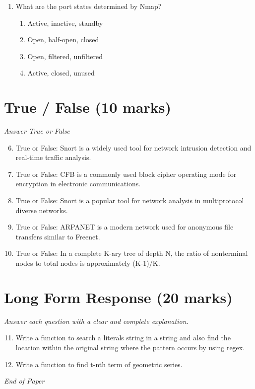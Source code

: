 \documentclass[12pt]{article}
\begin{document}
\begin{enumerate}[label=\arabic*.]
\begin{enumerate}[label=(\alph*)]
    \item Replaced
    \item Overview
    \item Changed
    \item Violated
\end{enumerate}
\item What are the port states determined by Nmap?
\begin{enumerate}[label=(\alph*)]
    \item Active, inactive, standby
    \item Open, half-open, closed
    \item Open, filtered, unfiltered
    \item Active, closed, unused
\end{enumerate}
\end{enumerate}

\section*{True / False (10 marks)}
\textit{Answer True or False}
\begin{enumerate}[label=\arabic*.]
\setcounter{enumi}{5}
\item True or False: Snort is a widely used tool for network intrusion detection and real-time traffic analysis.
\item True or False: CFB is a commonly used block cipher operating mode for encryption in electronic communications.
\item True or False: Snort is a popular tool for network analysis in multiprotocol diverse networks.
\item True or False: ARPANET is a modern network used for anonymous file transfers similar to Freenet.
\item True or False: In a complete K-ary tree of depth N, the ratio of nonterminal nodes to total nodes is approximately (K-1)/K.
\end{enumerate}

\section*{Long Form Response (20 marks)}
\textit{Answer each question with a clear and complete explanation.}
\begin{enumerate}[label=\arabic*.]
\setcounter{enumi}{10}
\item Write a function to search a literals string in a string and also find the location within the original string where the pattern occurs by using regex.
\item Write a function to find t-nth term of geometric series.
\end{enumerate}

\vfill
\noindent\textit{End of Paper}
\end{document}
